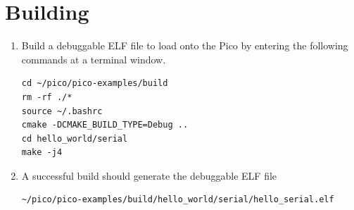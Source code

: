 \section{Building}
\begin{enumerate}
    \item Build a debuggable ELF file to load onto the Pico by entering the
    following commands at a terminal window.
    \begin{lstlisting}
cd ~/pico/pico-examples/build
rm -rf ./*
source ~/.bashrc
cmake -DCMAKE_BUILD_TYPE=Debug ..
cd hello_world/serial
make -j4
    \end{lstlisting}
    \item A successful build should generate the debuggable ELF file
    \begin{lstlisting}
~/pico/pico-examples/build/hello_world/serial/hello_serial.elf
    \end{lstlisting}
\end{enumerate}

